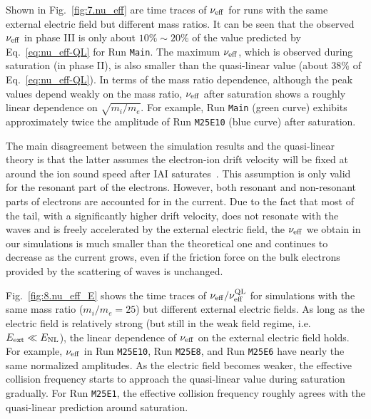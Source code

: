 \documentclass[%
 reprint,
 amsmath,
 amssymb,
 aps,
 prx,
floatfix,
superscriptaddress
]{revtex4-2}
\begin{document}
Shown in Fig.~\ref{fig:7.nu_eff} are time traces of $\nu_{\rm{eff}}$ for runs with the same external electric field but different mass ratios. 
It can be seen that the observed $\nu_{\rm{eff}}$ in phase III is only about $10\% \sim 20\%$ of the value predicted by Eq.~\eqref{eq:nu_eff-QL} for Run {\tt Main}.
The maximum $\nu_{\rm{eff}}$, which is observed during saturation (in phase II), is also smaller than the quasi-linear value (about 38\% of  Eq.~\eqref{eq:nu_eff-QL}).
In terms of the mass ratio dependence, although the peak values depend weakly on the mass ratio, $\nu_{\rm{eff}}$ after saturation shows a roughly linear dependence on $\sqrt{m_i/m_e}$. 
For example, Run {\tt Main} (green curve) exhibits approximately twice the amplitude of Run {\tt M25E10} (blue curve) after saturation.

The main disagreement between the simulation results and the quasi-linear theory is that the latter assumes the electron-ion drift velocity will be fixed at around the ion sound speed after IAI saturates~\cite{rudakov1966quasilinear,bychenkov1988ion}. 
This assumption is only valid for the resonant part of the electrons.
However, both resonant and non-resonant parts of electrons are accounted for in the current.
Due to the fact that most of the tail, with a significantly higher drift velocity, does not resonate with the waves and is freely accelerated by the external electric field, the  $\nu_{\rm{eff}}$ we obtain in our simulations is much smaller than the theoretical one and continues to decrease as the current grows, even if the friction force on the bulk electrons provided by the scattering of waves is unchanged.

Fig.~\ref{fig:8.nu_eff_E} shows the time traces of $\nu_{\rm{eff}}/\nu_{\rm{eff}}^{\rm{QL}}$ for simulations with the same mass ratio ($m_i/m_e=25$) but different external electric fields.
As long as the electric field is relatively strong (but still in the weak field regime, i.e. $E_{\rm{ext}} \ll E_{\rm{NL}}$), the linear dependence of $\nu_{\rm{eff}}$ on the external electric field holds.
For example, $\nu_{\rm{eff}}$ in Run {\tt M25E10}, Run {\tt M25E8}, and Run {\tt M25E6} have nearly the same normalized amplitudes.
As the electric field becomes weaker, the effective collision frequency starts to approach the quasi-linear value during saturation gradually.
For Run {\tt M25E1}, the effective collision frequency roughly agrees with the quasi-linear prediction around saturation.
\end{document}
